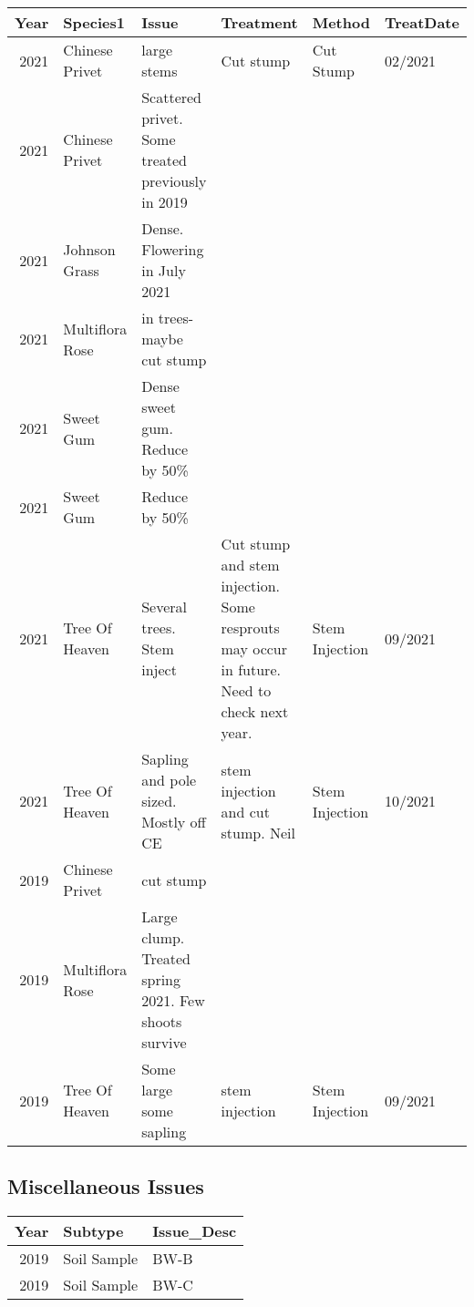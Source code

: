 \documentclass[
  landscape]{article}
\begin{document}
\begin{tabular}{r|l|l|l|l|l}
\hline
Year & Species1 & Issue & Treatment & Method & TreatDate\\
\hline
2021 & Chinese Privet & large stems & Cut stump & Cut Stump & 02/2021\\
\hline
2021 & Chinese Privet & Scattered privet. Some treated previously in 2019 &  &  & \\
\hline
2021 & Johnson Grass & Dense. Flowering in July 2021 &  &  & \\
\hline
2021 & Multiflora Rose & in trees- maybe cut stump &  &  & \\
\hline
2021 & Sweet Gum & Dense sweet gum. Reduce by 50\% &  &  & \\
\hline
2021 & Sweet Gum & Reduce by 50\% &  &  & \\
\hline
2021 & Tree Of Heaven & Several trees. Stem inject & Cut stump and stem injection. Some resprouts may occur in future. Need to check next year. & Stem Injection & 09/2021\\
\hline
2021 & Tree Of Heaven & Sapling and pole sized. Mostly off CE & stem injection and cut stump. Neil & Stem Injection & 10/2021\\
\hline
2019 & Chinese Privet & cut stump &  &  & \\
\hline
2019 & Multiflora Rose & Large clump. Treated spring 2021. Few shoots survive &  &  & \\
\hline
2019 & Tree Of Heaven & Some large some sapling & stem injection & Stem Injection & 09/2021\\
\hline
\end{tabular}

\hypertarget{miscellaneous-issues}{%
\subsection{Miscellaneous Issues}\label{miscellaneous-issues}}

\begin{tabular}{r|l|l}
\hline
Year & Subtype & Issue\_Desc\\
\hline
2019 & Soil Sample & BW-B\\
\hline
2019 & Soil Sample & BW-C\\
\hline
\end{tabular}
\end{document}

